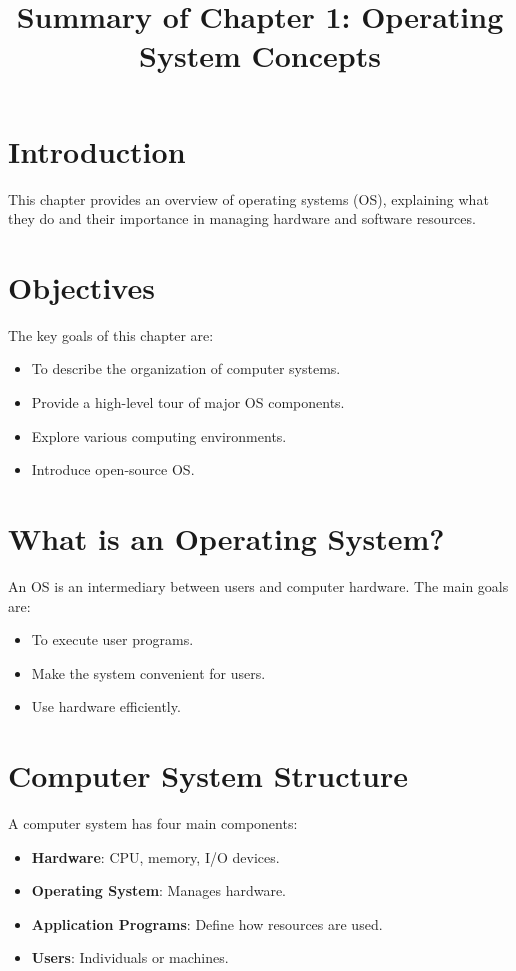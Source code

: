 \documentclass{article}
\title{Summary of Chapter 1: Operating System Concepts}
\author{}
\date{}
\begin{document}
\maketitle

\section{Introduction}
This chapter provides an overview of operating systems (OS), explaining what they do and their importance in managing hardware and software resources.

\section{Objectives}
The key goals of this chapter are:
\begin{itemize}
    \item To describe the organization of computer systems.
    \item Provide a high-level tour of major OS components.
    \item Explore various computing environments.
    \item Introduce open-source OS.
\end{itemize}

\section{What is an Operating System?}
An OS is an intermediary between users and computer hardware. The main goals are:
\begin{itemize}
    \item To execute user programs.
    \item Make the system convenient for users.
    \item Use hardware efficiently.
\end{itemize}

\section{Computer System Structure}
A computer system has four main components:
\begin{itemize}
    \item \textbf{Hardware}: CPU, memory, I/O devices.
    \item \textbf{Operating System}: Manages hardware.
    \item \textbf{Application Programs}: Define how resources are used.
    \item \textbf{Users}: Individuals or machines.
\end{itemize}
\end{document}
